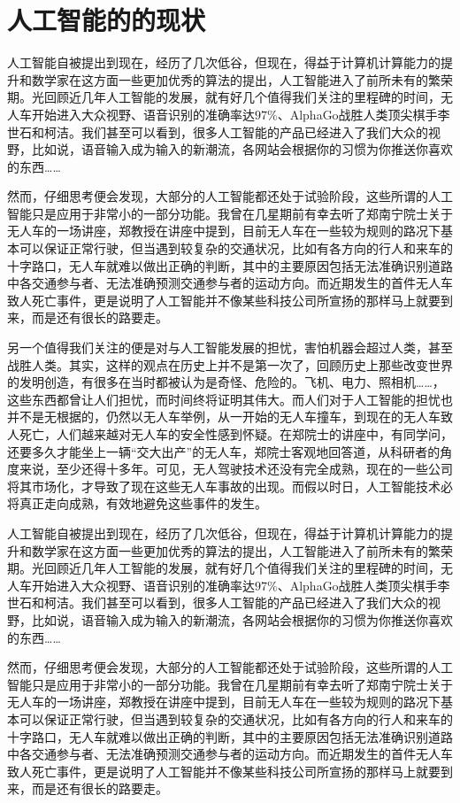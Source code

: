 \documentclass[UTF8]{XJTUthesis}
\begin{document}
\section{人工智能的的现状}
人工智能自被提出到现在，经历了几次低谷，但现在，得益于计算机计算能力的提升和数学家在这方面一些更加优秀的算法的提出，人工智能进入了前所未有的繁荣期。光回顾近几年人工智能的发展，就有好几个值得我们关注的里程碑的时间，无人车开始进入大众视野、语音识别的准确率达$97\%$、AlphaGo战胜人类顶尖棋手李世石和柯洁。我们甚至可以看到，很多人工智能的产品已经进入了我们大众的视野，比如说，语音输入成为输入的新潮流，各网站会根据你的习惯为你推送你喜欢的东西……\par
然而，仔细思考便会发现，大部分的人工智能都还处于试验阶段，这些所谓的人工智能只是应用于非常小的一部分功能。我曾在几星期前有幸去听了郑南宁院士关于无人车的一场讲座，郑教授在讲座中提到，目前无人车在一些较为规则的路况下基本可以保证正常行驶，但当遇到较复杂的交通状况，比如有各方向的行人和来车的十字路口，无人车就难以做出正确的判断，其中的主要原因包括无法准确识别道路中各交通参与者、无法准确预测交通参与者的运动方向。而近期发生的首件无人车致人死亡事件，更是说明了人工智能并不像某些科技公司所宣扬的那样马上就要到来，而是还有很长的路要走。\par
另一个值得我们关注的便是对与人工智能发展的担忧，害怕机器会超过人类，甚至战胜人类。其实，这样的观点在历史上并不是第一次了，回顾历史上那些改变世界的发明创造，有很多在当时都被认为是奇怪、危险的。飞机、电力、照相机……，这些东西都曾让人们担忧，而时间终将证明其伟大。而人们对于人工智能的担忧也并不是无根据的，仍然以无人车举例，从一开始的无人车撞车，到现在的无人车致人死亡，人们越来越对无人车的安全性感到怀疑。在郑院士的讲座中，有同学问，还要多久才能坐上一辆“交大出产”的无人车，郑院士客观地回答道，从科研者的角度来说，至少还得十多年。可见，无人驾驶技术还没有完全成熟，现在的一些公司将其市场化，才导致了现在这些无人车事故的出现。而假以时日，人工智能技术必将真正走向成熟，有效地避免这些事件的发生。\par
人工智能自被提出到现在，经历了几次低谷，但现在，得益于计算机计算能力的提升和数学家在这方面一些更加优秀的算法的提出，人工智能进入了前所未有的繁荣期。光回顾近几年人工智能的发展，就有好几个值得我们关注的里程碑的时间，无人车开始进入大众视野、语音识别的准确率达$97\%$、AlphaGo战胜人类顶尖棋手李世石和柯洁。我们甚至可以看到，很多人工智能的产品已经进入了我们大众的视野，比如说，语音输入成为输入的新潮流，各网站会根据你的习惯为你推送你喜欢的东西……\par
然而，仔细思考便会发现，大部分的人工智能都还处于试验阶段，这些所谓的人工智能只是应用于非常小的一部分功能。我曾在几星期前有幸去听了郑南宁院士关于无人车的一场讲座，郑教授在讲座中提到，目前无人车在一些较为规则的路况下基本可以保证正常行驶，但当遇到较复杂的交通状况，比如有各方向的行人和来车的十字路口，无人车就难以做出正确的判断，其中的主要原因包括无法准确识别道路中各交通参与者、无法准确预测交通参与者的运动方向。而近期发生的首件无人车致人死亡事件，更是说明了人工智能并不像某些科技公司所宣扬的那样马上就要到来，而是还有很长的路要走。\par
\end{document}

